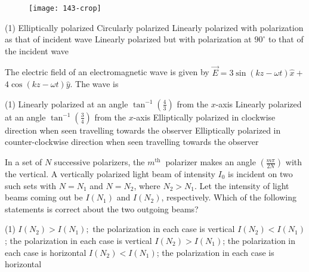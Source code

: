 \begin{enumerate}
\begin{minipage}{\textwidth}
	\begin{figure}[H]
		\centering
		\texttt{[image: 143-crop]}
	\end{figure}
\end{minipage}
\begin{tasks}(1)
	\task[\textbf{A.}]Elliptically polarized
	\task[\textbf{B.}]Circularly polarized
	\task[\textbf{C.}]Linearly polarized with polarization as that of incident wave
	\task[\textbf{D.}]Linearly polarized but with polarization at $90^{\circ}$ to that of the incident wave
\end{tasks}
\begin{minipage}{\textwidth}
	\item The electric field of an electromagnetic wave is given by $\vec{E}=3 \sin (k z-\omega t) \hat{x}+$ $4 \cos (k z-\omega t) \hat{y}$. The wave is
\end{minipage}
\begin{tasks}(1)
	\task[\textbf{A.}] Linearly polarized at an angle $\tan ^{-1}\left(\frac{4}{3}\right)$ from the $x$-axis
	\task[\textbf{B.}]Linearly polarized at an angle $\tan ^{-1}\left(\frac{3}{4}\right)$ from the $x$-axis
	\task[\textbf{C.}] Elliptically polarized in clockwise direction when seen travelling towards the observer
	\task[\textbf{D.}] Elliptically polarized in counter-clockwise direction when seen travelling towards the observer
\end{tasks}
\begin{minipage}{\textwidth}
	\item In a set of $N$ successive polarizers, the $m^{\text {th }}$ polarizer makes an angle $\left(\frac{m \pi}{2 N}\right)$ with the vertical. A vertically polarized light beam of intensity $I_{0}$ is incident on two such sets with $N=N_{1}$ and $N=N_{2}$, where $N_{2}>N_{1} .$ Let the intensity of light beams coming out be $I\left(N_{1}\right)$ and $I\left(N_{2}\right)$, respectively. Which of the following statements is correct about the two outgoing beams?
\end{minipage}
\begin{tasks}(1)
	\task[\textbf{A.}] $I\left(N_{2}\right)>I\left(N_{1}\right) ;$ the polarization in each case is vertical
	\task[\textbf{B.}]$I\left(N_{2}\right)<I\left(N_{1}\right)$; the polarization in each case is vertical
	\task[\textbf{C.}]$I\left(N_{2}\right)>I\left(N_{1}\right)$; the polarization in each case is horizontal
	\task[\textbf{D.}]$I\left(N_{2}\right)<I\left(N_{1}\right)$; the polarization in each case is horizontal

\end{tasks}
\end{enumerate}
